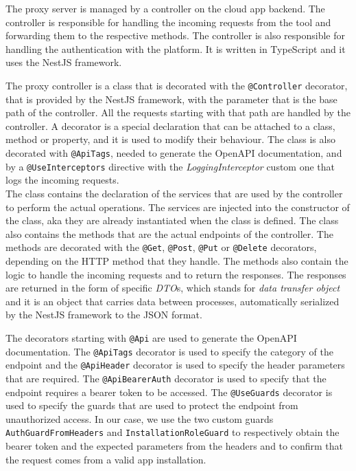 The proxy server is managed by a controller on the cloud app backend. The controller is responsible for handling the incoming requests from the tool and forwarding them to the respective methods. The controller is also responsible for handling the authentication with the platform. It is written in TypeScript and it uses the NestJS framework.

The proxy controller is a class that is decorated with the \texttt{@Controller} decorator, that is provided by the NestJS framework, with the parameter that is the base path of the controller. All the requests starting with that path are handled by the controller. A decorator is a special declaration that can be attached to a class, method or property, and it is used to modify their behaviour. The class is also decorated with \texttt{@ApiTags}, needed to generate the OpenAPI documentation, and by a \texttt{@UseInterceptors} directive with the \textit{LoggingInterceptor} custom one that logs the incoming requests. \\
The class contains the declaration of the services that are used by the controller to perform the actual operations. The services are injected into the constructor of the class, aka they are already instantiated when the class is defined. The class also contains the methods that are the actual endpoints of the controller. The methods are decorated with the \texttt{@Get}, \texttt{@Post}, \texttt{@Put} or \texttt{@Delete} decorators, depending on the HTTP method that they handle. The methods also contain the logic to handle the incoming requests and to return the responses. The responses are returned in the form of specific \textit{DTO}s, which stands for \textit{data transfer object} and it is an object that carries data between processes, automatically serialized by the NestJS framework to the JSON format.

The decorators starting with \texttt{@Api} are used to generate the OpenAPI documentation. The \texttt{@ApiTags} decorator is used to specify the category of the endpoint and the \texttt{@ApiHeader} decorator is used to specify the header parameters that are required. The \texttt{@ApiBearerAuth} decorator is used to specify that the endpoint requires a bearer token to be accessed. The \texttt{@UseGuards} decorator is used to specify the guards that are used to protect the endpoint from unauthorized access. In our case, we use the two custom guards \texttt{AuthGuardFromHeaders} and \texttt{InstallationRoleGuard} to respectively obtain the bearer token and the expected parameters from the headers and to confirm that the request comes from a valid app installation.

